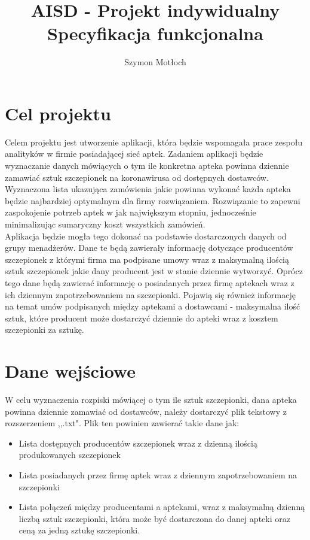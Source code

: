 \documentclass[12pt]{article}
\begin{document}
\begin{titlepage}
\title{AISD - Projekt indywidualny \\
Specyfikacja funkcjonalna 
}
\author{Szymon Motłoch}
\maketitle
\end{titlepage}
\section{Cel projektu}
\qquad Celem projektu jest utworzenie aplikacji, która będzie wspomagała prace zespołu analityków w firmie posiadającej sieć aptek. Zadaniem aplikacji będzie wyznaczanie danych mówiących o tym ile konkretna apteka powinna dziennie zamawiać sztuk szczepionek na koronawirusa od dostępnych dostawców. Wyznaczona lista ukazująca zamówienia jakie powinna wykonać każda apteka będzie najbardziej optymalnym dla firmy rozwiązaniem. Rozwiązanie to zapewni zaspokojenie potrzeb aptek w jak największym stopniu, jednocześnie minimalizując sumaryczny koszt wszystkich zamówień. \\
\qquad Aplikacja będzie mogła tego dokonać na podstawie dostarczonych danych od grupy menadżerów. Dane te będą zawierały informację dotyczące producentów szczepionek z którymi firma ma podpisane umowy wraz z maksymalną ilością sztuk szczepionek jakie dany producent jest w stanie dziennie wytworzyć. Oprócz tego dane będą zawierać informację o posiadanych przez firmę aptekach wraz z ich dziennym zapotrzebowaniem na szczepionki. Pojawią się również informację na temat umów podpisanych między aptekami a dostawcami - maksymalna ilość sztuk, które producent może dostarczyć dziennie do apteki wraz z kosztem szczepionki za sztukę.

\section{Dane wejściowe}
\qquad W celu wyznaczenia rozpiski mówiącej o tym ile sztuk szczepionki, dana apteka powinna dziennie zamawiać od dostawców, należy dostarczyć plik tekstowy z rozszerzeniem ,,.txt".
Plik ten powinien zawierać takie dane jak:

\begin{itemize}
  \item Lista dostępnych producentów szczepionek wraz z dzienną ilością produkowanych szczepionek
  \item Lista posiadanych przez firmę aptek wraz z dziennym zapotrzebowaniem na szczepionki
  \item Lista połączeń między producentami a aptekami, wraz z maksymalną dzienną liczbą sztuk szczepionki, która może być dostarczona do danej apteki oraz ceną za jedną sztukę szczepionki.
\end{itemize}
\end{document}
